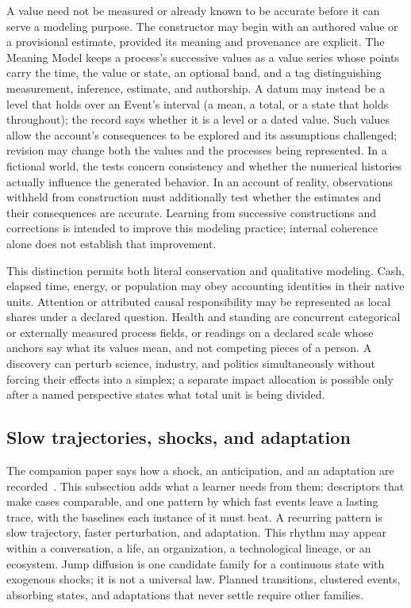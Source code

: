 \documentclass[10pt]{article}
\begin{document}
A value need not be measured or already known to be accurate before it can
serve a modeling purpose. The constructor may begin with an authored value or
a provisional estimate, provided its meaning and provenance are explicit.
The Meaning Model keeps a process's successive values as a value series whose
points carry the time, the value or state, an optional band, and a tag distinguishing measurement, inference, estimate, and authorship.
A datum may instead be a level that holds over an Event's interval (a mean, a total, or a
state that holds throughout); the record says whether it is a level or a dated value.
Such values allow the account's consequences to be explored and its
assumptions challenged; revision may change both the values and the processes
being represented. In a fictional world, the tests concern consistency and
whether the numerical histories actually influence the generated behavior.
In an account of reality, observations withheld from construction must
additionally test whether the estimates and their consequences are accurate.
Learning from successive constructions and corrections is intended to improve
this modeling practice; internal coherence alone does not establish that
improvement.

This distinction permits both literal conservation and qualitative modeling.
Cash, elapsed time, energy, or population may obey accounting identities in
their native units. Attention or attributed causal responsibility may be
represented as local shares under a declared question. Health and standing are
concurrent categorical or externally measured process fields, or readings on a
declared scale whose anchors say what its values mean, and not competing pieces
of a person. A discovery can
perturb science, industry, and politics simultaneously without forcing their
effects into a simplex; a separate impact allocation is possible only after a
named perspective states what total unit is being divided.

\subsection{Slow trajectories, shocks, and adaptation}

The companion paper says how a shock, an anticipation, and an adaptation are
recorded~\cite{westerbergMeaning2026}. This subsection adds what a learner needs from
them: descriptors that make cases comparable, and one pattern by which fast events
leave a lasting trace, with the baselines each instance of it must beat. A recurring
pattern is slow trajectory, faster perturbation, and adaptation. This rhythm may appear within a conversation, a life, an
organization, a technological lineage, or an ecosystem. Jump diffusion is one
candidate family for a continuous state with exogenous shocks; it is not a
universal law. Planned transitions, clustered events, absorbing states, and
adaptations that never settle require other families.
\end{document}
